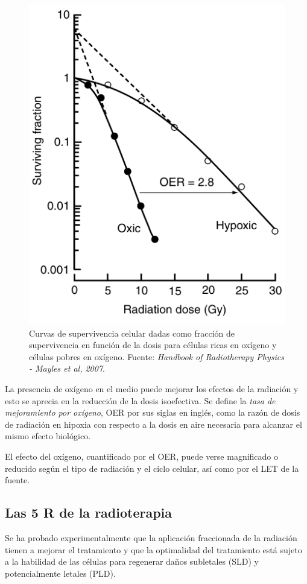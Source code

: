 \documentclass[12pt,letterpaper, oneside]{book}
\begin{document}
			\begin{figure}[h!]
				\centering
				\includegraphics[scale=0.40]{imagenes/oxic_hypoxic_sc_Mayles2007.png}
				\caption{Curvas de supervivencia celular dadas como fracción de supervivencia en función de la dosis para células ricas en oxígeno y células pobres en oxígeno. Fuente: \textit{Handbook of Radiotherapy Physics - Mayles et al, 2007}.}\label{oxic_hypoxic_sc_Mayles2007}
			\end{figure}  
		
		La presencia de oxígeno en el medio puede mejorar los efectos de la radiación y esto se aprecia en la reducción de la dosis isoefectiva\cite{Mayles.2007}. Se define la \textit{tasa de mejoramiento por oxígeno}, OER por sus siglas en inglés, como la razón de dosis de radiación en hipoxia con respecto a la dosis en aire necesaria para alcanzar el mismo efecto biológico\cite{Mayles.2007, Smith.2000}. 
		
		El efecto del oxígeno, cuantificado por el OER, puede verse magnificado o reducido según el tipo de radiación y el ciclo celular, así como por el LET de la fuente\cite{Hall.2000}. 
		
		\subsection{Las 5 R de la radioterapia}
			Se ha probado experimentalmente que la aplicación fraccionada de la radiación tienen a mejorar el tratamiento\cite{Mayles.2007} y que la optimalidad del tratamiento está sujeto a la habilidad de las células para regenerar daños subletales (SLD) y potencialmente letales (PLD)\cite{Bleehen.2007}. 
			
\end{document}
